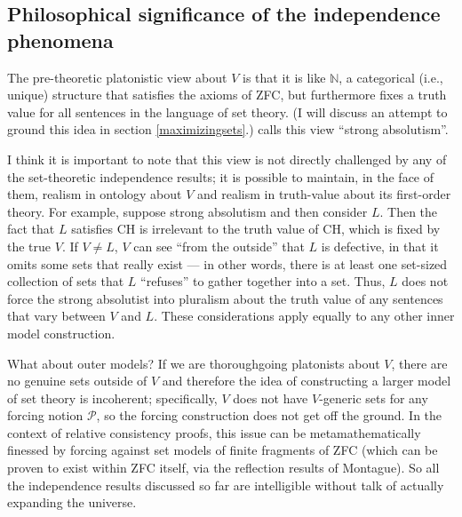 \documentclass[letterpaper,12pt]{article}
\begin{document}
\subsection{Philosophical significance of the independence phenomena}
\label{philosophicalsignificance}
The pre-theoretic platonistic view about $V$ is that it is like $\mathbb{N}$, a categorical (i.e., unique) structure that satisfies the axioms of ZFC, but furthermore fixes a truth value for all sentences in the language of set theory. (I will discuss an attempt to ground this idea in section \ref{maximizingsets}.) \cite{steel2012godel} calls this view ``strong absolutism''.

I think it is important to note that this view is not directly challenged by any of the set-theoretic independence results; it is possible to maintain, in the face of them, realism in ontology about $V$ and realism in truth-value about its first-order theory. For example, suppose strong absolutism and then consider $L$. Then the fact that $L$ satisfies CH is irrelevant to the truth value of CH, which is fixed by the true $V$. If $V \not = L$, $V$ can see ``from the outside'' that $L$ is defective, in that it omits some sets that really exist --- in other words, there is at least one set-sized collection of sets that $L$ ``refuses'' to gather together into a set. Thus, $L$ does not force the strong absolutist into pluralism about the truth value of any sentences that vary between $V$ and $L$. These considerations apply equally to any other inner model construction.

What about outer models? If we are thoroughgoing platonists about $V$, there are no genuine sets outside of $V$ and therefore the idea of constructing a larger model of set theory is incoherent; specifically, $V$ does not have $V$-generic sets for any forcing notion $\mathcal{P}$, so the forcing construction does not get off the ground. In the context of relative consistency proofs, this issue can be metamathematically finessed by forcing against set models of finite fragments of ZFC (which can be proven to exist within ZFC itself, via the reflection results of Montague). So all the independence results discussed so far are intelligible without talk of actually expanding the universe.
\end{document}
